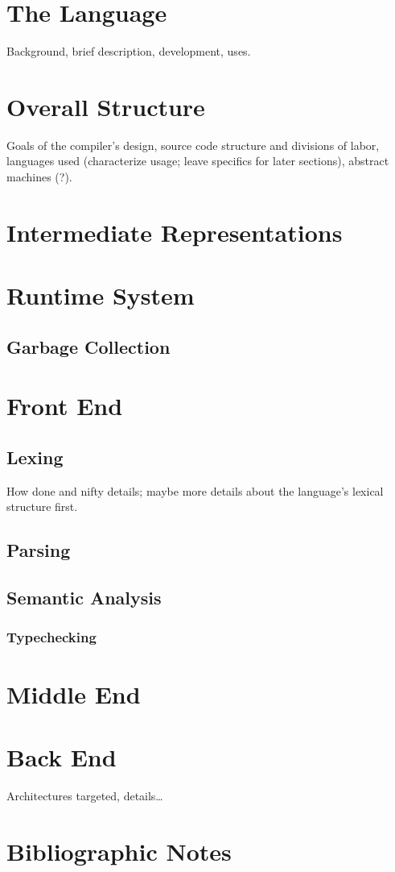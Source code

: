\label{functional:ghc}\hypertarget{casestudies}{}
\section{The Language}
Background, brief description, development, uses.

\section{Overall Structure}
Goals of the compiler's design, source code structure and divisions of labor, languages used (characterize usage; leave specifics for later sections), abstract machines (?).

\section{Intermediate Representations}

\section{Runtime System}

\subsection{Garbage Collection}

\section{Front End}
\subsection{Lexing}
How done and nifty details; maybe more details about the language's lexical structure first.

\subsection{Parsing}

\subsection{Semantic Analysis}

\subsubsection{Typechecking}

\section{Middle End}

\section{Back End}
Architectures targeted, details\dots

\section{Bibliographic Notes}